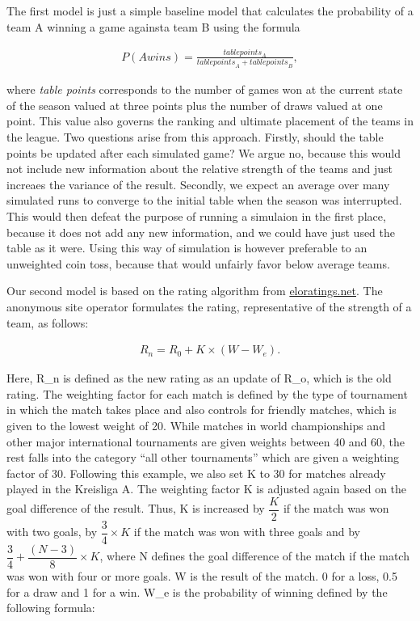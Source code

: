 \documentclass[12pt,a4paper]{article}
\begin{document}
The first model is just a simple baseline model that calculates the
probability of a team A winning a game againsta team B using the formula

\begin{align}
P(A wins) = \frac{table points_A}{{table points}_A + {table points}_B},
\end{align}

where \emph{table points} corresponds to the number of games won at the
current state of the season valued at three points plus the number of
draws valued at one point. This value also governs the ranking and
ultimate placement of the teams in the league. Two questions arise from
this approach. Firstly, should the table points be updated after each
simulated game? We argue no, because this would not include new
information about the relative strength of the teams and just increaes
the variance of the result. Secondly, we expect an average over many
simulated runs to converge to the initial table when the season was
interrupted. This would then defeat the purpose of running a simulaion
in the first place, because it does not add any new information, and we
could have just used the table as it were. Using this way of simulation
is however preferable to an unweighted coin toss, because that would
unfairly favor below average teams.

Our second model is based on the rating algorithm from
\href{eloratings.net/about}{eloratings.net}. The anonymous site operator
formulates the rating, representative of the strength of a team, as
follows:

\begin{align}
R_n = R_0 + K \times (W - W_e).
\end{align}

Here, R\_n is defined as the new rating as an update of R\_o, which is
the old rating. The weighting factor for each match is defined by the
type of tournament in which the match takes place and also controls for
friendly matches, which is given to the lowest weight of 20. While
matches in world championships and other major international tournaments
are given weights between 40 and 60, the rest falls into the category
\enquote{all other tournaments} which are given a weighting factor of
30. Following this example, we also set K to 30 for matches already
played in the Kreisliga A. The weighting factor K is adjusted again
based on the goal difference of the result. Thus, K is increased by
\(\dfrac{K}{2}\) if the match was won with two goals, by
\(\dfrac{3}{4}\times K\) if the match was won with three goals and by
\(\dfrac{3}{4} + \dfrac{(N-3)}{8} \times K\), where N defines the goal
difference of the match if the match was won with four or more goals. W
is the result of the match. 0 for a loss, 0.5 for a draw and 1 for a
win. W\_e is the probability of winning defined by the following
formula:
\end{document}
